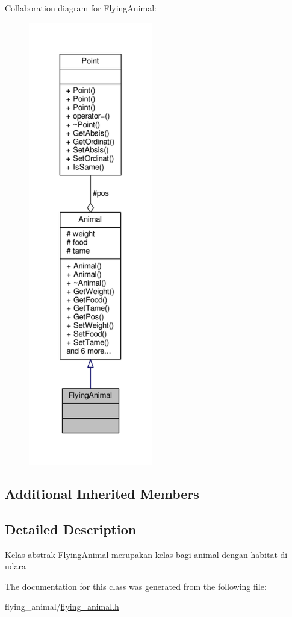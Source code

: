 Collaboration diagram for Flying\+Animal\+:
\nopagebreak
\begin{figure}[H]
\begin{center}
\leavevmode
\includegraphics[height=550pt]{classFlyingAnimal__coll__graph}
\end{center}
\end{figure}
\subsection*{Additional Inherited Members}


\subsection{Detailed Description}
Kelas abstrak \hyperlink{classFlyingAnimal}{Flying\+Animal} merupakan kelas bagi animal dengan habitat di udara 

The documentation for this class was generated from the following file\+:\begin{DoxyCompactItemize}
\item 
flying\+\_\+animal/\hyperlink{flying__animal_8h}{flying\+\_\+animal.\+h}\end{DoxyCompactItemize}
